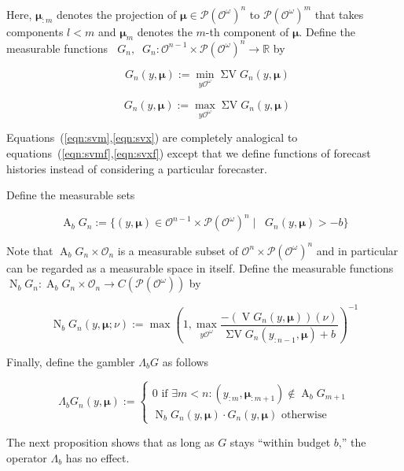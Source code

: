 \documentclass[aop,preprint]{imsart}
\numberwithin{equation}{section}
\theoremstyle{definition}
\theoremstyle{plain}
\newcommand{\Reals}{\mathbb{R}}
\newcommand{\PM}{\mathcal{P}}
\newcommand{\Ob}{\mathcal{O}}
\newcommand{\OO}{\Ob^\omega}
\newcommand{\PMO}{\PM(\OO)}
\DeclareMathOperator{\V}{V}
\DeclareMathOperator{\SV}{\Sigma V}
\DeclareMathOperator{\SVM}{\Sigma V_{\min}}
\DeclareMathOperator{\SVX}{\Sigma V_{\max}}
\DeclareMathOperator{\Ab}{A}
\DeclareMathOperator{\Nr}{N}
\newcommand{\Bd}{\Lambda}
\newcommand{\BM}{\bm{\mu}}
\begin{document}
Here, $\BM_{:m}$ denotes the projection of $\BM \in \PMO^n$ to $\PMO^m$ that takes components $l < m$ and $\BM_m$ denotes the $m$-th component of $\BM$. Define the measurable functions $\SVM G_n, \SVX G_n: \Ob^{n-1} \times \PMO^n  \rightarrow \Reals$ by

\begin{equation}
\label{eqn:svm}
\SVM G_n\left(y,\BM\right) := \min_{y\OO}{\SV G_n\left(y,\BM\right)}
\end{equation}

\begin{equation}
\label{eqn:svx}
\SVX G_n\left(y,\BM\right) := \max_{y\OO}{\SV G_n\left(y,\BM\right)}
\end{equation}

Equations~(\ref{eqn:svm},\ref{eqn:svx}) are completely analogical to equations~(\ref{eqn:svmf},\ref{eqn:svxf}) except that we define functions of forecast histories instead of considering a particular forecaster.

Define the measurable sets

\begin{equation}
\Ab_b G_n:=\{\left(y,\BM\right) \in \Ob^{n-1} \times \PMO^n \mid \SVM G_n\left(y,\BM\right) > -b\}
\end{equation}

Note that $\Ab_b G_n \times \Ob_n$ is a measurable subset of $\Ob^n \times \PMO^n$ and in particular can be regarded as a measurable space in itself. Define the measurable functions $\Nr_b G_n: \Ab_b G_n \times \Ob_n \rightarrow C\left(\PMO\right)$ by

\begin{equation}
\Nr_b G_n\left(y,\BM;\nu\right):=\max\left(1,\max_{y\OO} \frac{-\left(\V G_n\left(y,\BM\right)\right)\left(\nu\right)}{\SV G_n\left(y_{:n-1},\BM\right)+b}\right)^{-1}
\end{equation}

Finally, define the gambler $\Bd_b G$ as follows

\begin{equation}
\Bd_b G_n\left(y,\BM\right):=\begin{cases} 0 \text{ if } \exists m < n: \left(y_{:m},\BM_{:m+1}\right) \not\in \Ab_b G_{m+1} \\ \Nr_b G_n\left(y,\BM\right) \cdot G_n\left(y, \BM\right) \text{ otherwise} \end{cases}
\end{equation}

The next proposition shows that as long as $G$ stays \enquote{within budget $b$,} the operator $\Bd_b$ has no effect. 
\end{document}
